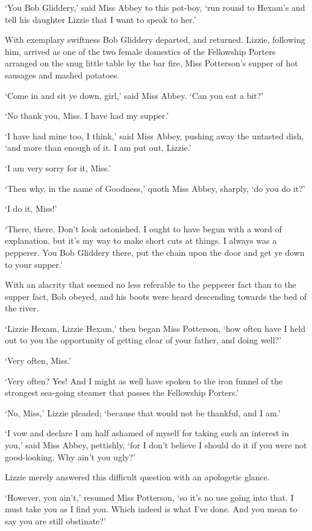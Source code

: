‘You Bob Gliddery,’ said Miss Abbey to this pot-boy, ‘run round to
Hexam’s and tell his daughter Lizzie that I want to speak to her.’

With exemplary swiftness Bob Gliddery departed, and returned. Lizzie,
following him, arrived as one of the two female domestics of the
Fellowship Porters arranged on the snug little table by the bar fire,
Miss Potterson’s supper of hot sausages and mashed potatoes.

‘Come in and sit ye down, girl,’ said Miss Abbey. ‘Can you eat a bit?’

‘No thank you, Miss. I have had my supper.’

‘I have had mine too, I think,’ said Miss Abbey, pushing away the
untasted dish, ‘and more than enough of it. I am put out, Lizzie.’

‘I am very sorry for it, Miss.’

‘Then why, in the name of Goodness,’ quoth Miss Abbey, sharply, ‘do you
do it?’

‘I do it, Miss!’

‘There, there. Don’t look astonished. I ought to have begun with a word
of explanation, but it’s my way to make short cuts at things. I always
was a pepperer. You Bob Gliddery there, put the chain upon the door and
get ye down to your supper.’

With an alacrity that seemed no less referable to the pepperer fact
than to the supper fact, Bob obeyed, and his boots were heard descending
towards the bed of the river.

‘Lizzie Hexam, Lizzie Hexam,’ then began Miss Potterson, ‘how often have
I held out to you the opportunity of getting clear of your father, and
doing well?’

‘Very often, Miss.’

‘Very often? Yes! And I might as well have spoken to the iron funnel of
the strongest sea-going steamer that passes the Fellowship Porters.’

‘No, Miss,’ Lizzie pleaded; ‘because that would not be thankful, and I
am.’

‘I vow and declare I am half ashamed of myself for taking such an
interest in you,’ said Miss Abbey, pettishly, ‘for I don’t believe I
should do it if you were not good-looking. Why ain’t you ugly?’

Lizzie merely answered this difficult question with an apologetic
glance.

‘However, you ain’t,’ resumed Miss Potterson, ‘so it’s no use going into
that. I must take you as I find you. Which indeed is what I’ve done. And
you mean to say you are still obstinate?’

